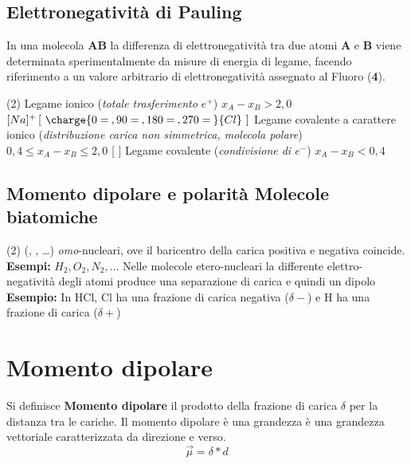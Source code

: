\documentclass{book}
\begin{document}
\subsection{Elettronegatività di Pauling}
In una molecola \textbf{AB} la differenza di elettronegatività tra due atomi
\textbf{A} e \textbf{B} viene determinata sperimentalmente da misure di energia
di legame, facendo riferimento a un valore arbitrario di elettronegatività
assegnato al Fluoro (\textbf{4}).
\begin{tasks}(2)
	\task Legame ionico (\textit{totale trasferimento $e^+$}) $x_A-x_B>2,0$
	$[Na]^+\left[\text{ }\charge{0=\:,90=\:,180=\:, 270=\:}{Cl}\text{ } \right]$
	\task Legame covalente a carattere ionico (\textit{distribuzione carica non
	simmetrica, molecola polare})\\ $0,4\leq x_A-x_B\leq 2,0$
	[ ]
	\task Legame covalente (\textit{condivisione di $e^-$}) $x_A-x_B<0,4$
\end{tasks}
\subsection{Momento dipolare e polarità Molecole biatomiche}
\begin{tasks}(2)
	 (, , \dots)
	\textit{omo}-nucleari, ove il baricentro della carica positiva e negativa
	coincide.\\
	\textbf{Esempi:} $H_2, O_2, N_2, \dots$
	 Nelle molecole etero-nucleari la differente
	elettro-negatività degli atomi produce una separazione di carica e quindi
	un dipolo\\
	\textbf{Esempio:} In HCl, Cl ha una frazione di carica negativa ($\delta-$)
	e H ha una frazione di carica ($\delta+$)
\end{tasks}
\section{Momento dipolare}
Si definisce \textbf{Momento dipolare} il prodotto della frazione di carica
$\delta$ per la distanza tra le cariche. Il momento dipolare è una grandezza è
una grandezza vettoriale caratterizzata da direzione e verso.
\begin{equation}
	\vec{\mu} = \delta * d
\end{equation}
\end{document}
